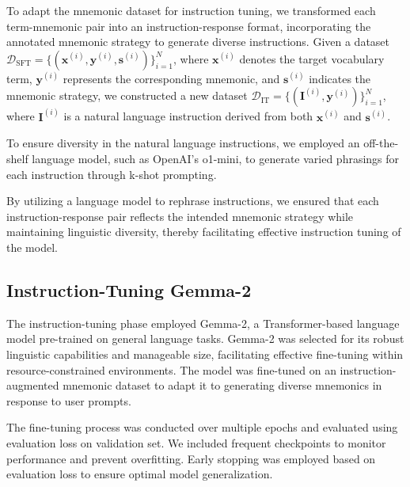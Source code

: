 \documentclass{article}
\newcounter{para}
\begin{document}
To adapt the mnemonic dataset for instruction tuning, we transformed each term-mnemonic pair into an instruction-response format, incorporating the annotated mnemonic strategy to generate diverse instructions. Given a dataset \( \mathcal{D}_{\text{SFT}} = \{(\mathbf{x}^{(i)}, \mathbf{y}^{(i)}, \mathbf{s}^{(i)})\}_{i=1}^N \), where \( \mathbf{x}^{(i)} \) denotes the target vocabulary term, \( \mathbf{y}^{(i)} \) represents the corresponding mnemonic, and \( \mathbf{s}^{(i)} \) indicates the mnemonic strategy, we constructed a new dataset \( \mathcal{D}_{\text{IT}} = \{(\mathbf{I}^{(i)}, \mathbf{y}^{(i)})\}_{i=1}^N \), where \( \mathbf{I}^{(i)} \) is a natural language instruction derived from both \( \mathbf{x}^{(i)} \) and \( \mathbf{s}^{(i)} \).

To ensure diversity in the natural language instructions, we employed an off-the-shelf language model, such as OpenAI's o1-mini, to generate varied phrasings for each instruction through k-shot prompting.

By utilizing a language model to rephrase instructions, we ensured that each instruction-response pair reflects the intended mnemonic strategy while maintaining linguistic diversity, thereby facilitating effective instruction tuning of the model.

\subsection{Instruction-Tuning Gemma-2} \label{sec:met-it-gemma}

The instruction-tuning phase employed Gemma-2, a Transformer-based language model pre-trained on general language tasks. Gemma-2 was selected for its robust linguistic capabilities and manageable size, facilitating effective fine-tuning within resource-constrained environments. The model was fine-tuned on an instruction-augmented mnemonic dataset to adapt it to generating diverse mnemonics in response to user prompts.

The fine-tuning process was conducted over multiple epochs and evaluated using evaluation loss on validation set. We included frequent checkpoints to monitor performance and prevent overfitting. Early stopping was employed based on evaluation loss to ensure optimal model generalization.

\end{document}
